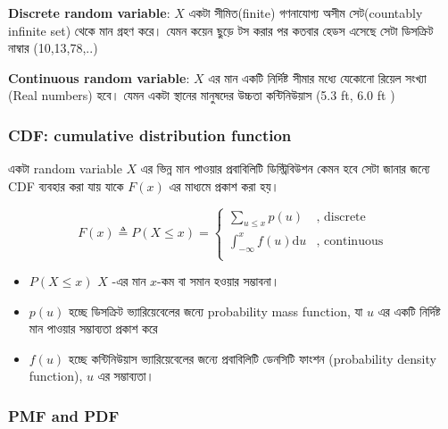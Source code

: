 \documentclass[graybox, envcountchap, twocolumn]{styles/svmult}
\begin{document}
{%

\textbf{Discrete random variable}: $X$ একটা সীমিত(finite) গণনাযোগ্য অসীম সেট(countably infinite set) থেকে মান গ্রহণ করে। যেমন কয়েন ছুড়ে টস করার পর কতবার হেডস এসেছে সেটা ডিসক্রিট নাম্বার (10,13,78,..)

\textbf{Continuous random variable}:  $X$ এর মান একটি নির্দিষ্ট সীমার মধ্যে যেকোনো রিয়েল সংখ্যা (Real  numbers) হবে। যেমন একটা স্থানের মানুষদের উচ্চতা কন্টিনিউয়াস (5.3 ft, 6.0 ft )


\subsubsection{CDF: cumulative distribution function}
একটা random variable $X$ এর ভিন্ন মান পাওয়ার প্রবাবিলিটি ডিস্ট্রিবিউশন কেমন হবে সেটা জানার জন্যে CDF ব্যবহার করা যায় যাকে $𝐹(𝑥)$ এর মাধ্যমে প্রকাশ করা হয়। 
}

\begin{equation}
F(x) \triangleq P(X \leq x)=\begin{cases}
\sum_{u \leq x}p(u) & \text{, discrete}\\
\int_{-\infty}^{x} f(u)\mathrm{d}u & \text{, continuous}\\
\end{cases}
\end{equation}
\bengalifont
\begin{itemize}
    \item $  P(X \leq x) $ $X$ -{\bengalifont এর মান} $x$-{ কম বা সমান হওয়ার সম্ভাবনা।}
    \item $p(u)$ {\bengalifont হচ্ছে ডিসক্রিট ভ্যারিয়েবেলের জন্যে probability mass function, যা $u$ এর একটি নির্দিষ্ট মান পাওয়ার সম্ভাব্যতা প্রকাশ করে }
    \item $ f(u)$ {\bengalifont হচ্ছে কন্টিনিউয়াস ভ্যারিয়েবেলের জন্যে প্রবাবিলিটি ডেনসিটি ফাংশন (probability density function), $u$ এর সম্ভাব্যতা। } 
\end{itemize}


\bengalifont
\subsubsection{PMF and PDF}
\end{document}
